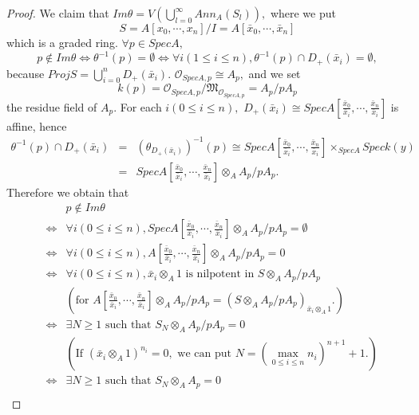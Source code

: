 \begin{proof}
We claim that $Im\theta=V(\bigcup\limits_{l=0}^{\infty}Ann_A(S_l)),$
where we put
$$S=A[x_0,\cdots,x_n]/I=A[\bar{x}_0,\cdots,\bar{x}_n]$$
which is a graded ring. $\forall p\in SpecA,$
$$p\not\in Im\theta\Longleftrightarrow\theta^{-1}(p)=\emptyset
\Longleftrightarrow\forall i(1\leqslant i\leqslant
n),\theta^{-1}(p)\cap D_+(\bar{x}_i)=\emptyset,$$ because
$ProjS=\bigcup\limits_{i=0}^nD_+(\bar{x}_i).$ $\mathcal
{O}_{SpecA,p}\cong A_p,$ and we set $$k(p)=\mathcal
{O}_{SpecA,p}/\mathfrak{M}_{\mathcal {O}_{SpecA,p}}=A_p/pA_p$$ the
residue field of $A_p.$ For each $i(0\leqslant i\leqslant n),$
$D_+(\bar{x}_i)\cong
SpecA[\frac{\bar{x}_0}{\bar{x}_i},\cdots,\frac{\bar{x}_n}{\bar{x}_i}]$
is affine, hence
\begin{eqnarray*}
\theta^{-1}(p)\cap D_+(\bar{x}_i) & = &
(\theta_{D_+(\bar{x}_i)})^{-1}(p)\cong
SpecA[\frac{\bar{x}_0}{\bar{x}_i},\cdots,\frac{\bar{x}_n}{\bar{x}_i}]\times_{SpecA}Speck(y)\\
& = &
SpecA[\frac{\bar{x}_0}{\bar{x}_i},\cdots,\frac{\bar{x}_n}{\bar{x}_i}]\otimes_A
A_p/pA_p.
\end{eqnarray*}
Therefore we obtain that
\begin{eqnarray*}
& & p\not\in Im\theta                                             \\
& \Longleftrightarrow & \forall i(0\leqslant i\leqslant n),
SpecA[\frac{\bar{x}_0}{\bar{x}_i},\cdots,\frac{\bar{x}_n}{\bar{x}_i}]
\otimes_A A_p/pA_p=\emptyset                                      \\
& \Longleftrightarrow & \forall i(0\leqslant i\leqslant n),
A[\frac{\bar{x}_0}{\bar{x}_i},\cdots,\frac{\bar{x}_n}{\bar{x}_i}]
\otimes_A A_p/pA_p=0                                              \\
& \Longleftrightarrow & \forall i(0\leqslant i\leqslant n),
\bar{x}_i\otimes_A 1 \text{ is nilpotent in }S\otimes_A A_p/pA_p  \\
& & (\text{for }
A[\frac{\bar{x}_0}{\bar{x}_i},\cdots,\frac{\bar{x}_n}{\bar{x}_i}]
\otimes_A A_p/pA_p=(S\otimes_A A_p/pA_p)_{\bar{x}_i\otimes_A 1}.)  \\
& \Longleftrightarrow & \exists N\geqslant 1 \text{ such that }
S_N\otimes_A A_p/pA_p=0                                           \\
& & (\text{If } (\bar{x}_i\otimes_A 1)^{n_i}=0,\text{ we can put }
N=(\max\limits_{0\leqslant i\leqslant n}n_i)^{n+1}+1.)             \\
& \Longleftrightarrow & \exists N\geqslant 1 \text{ such that }
S_N\otimes_A A_p=0                                                \\

\end{eqnarray*}
\end{proof}
